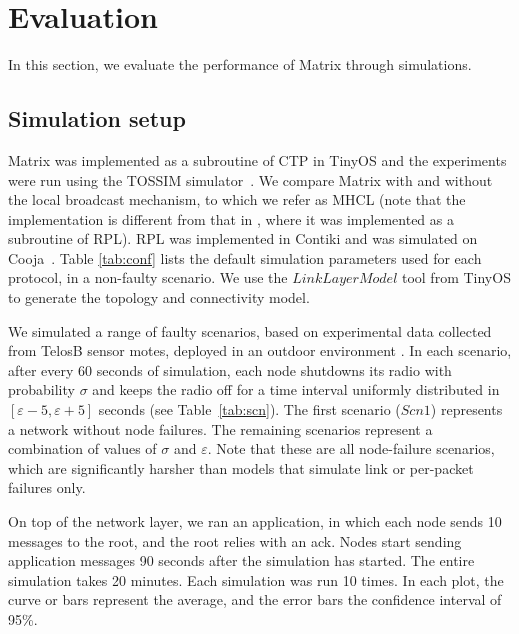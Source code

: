 \section{Evaluation}
\label{sec:results}

In this section, we evaluate the performance of Matrix through
simulations.

\subsection{Simulation setup}\label{subsec:sim}

Matrix was implemented as a subroutine of CTP in TinyOS \cite{tinyos}
and the experiments were run using the TOSSIM simulator~\cite{tossim}. We
compare Matrix with and without the local broadcast mechanism, to which we refer
as MHCL (note that the implementation is
different from that in \cite{2016techreport}, where it was implemented as a
subroutine of RPL). RPL was implemented in Contiki \cite{Dunkels:2004} and was
simulated on Cooja~\cite{Eriksson:2009}. Table \ref{tab:conf} lists the default
simulation parameters used for each protocol, in a non-faulty scenario. We use the $LinkLayerModel$ tool from TinyOS to generate the topology and connectivity model. %

We simulated a range of faulty scenarios, based on experimental data collected
from TelosB sensor motes, deployed in an outdoor
environment \cite{Baccour:2012}. In each scenario, after every 60 seconds of
simulation, each node shutdowns its radio with probability $\sigma$ and keeps
the radio off for a time interval uniformly distributed in
$[\varepsilon - 5, \varepsilon + 5]$ seconds (see Table~\ref{tab:scn}).
The first scenario ($Scn1$) represents a network without node failures. The
remaining scenarios represent a combination of values of $\sigma$ and
$\varepsilon$. Note that these are all node-failure scenarios, which are
significantly harsher than models that simulate link or per-packet
failures only.

On top of the network layer, we ran an application, in which each node
sends 10 messages to the root, and the root relies with an ack. Nodes start sending application messages 90 seconds after the simulation has started. The entire
simulation takes 20 minutes. Each simulation was run 10 times. In each plot,
the curve or bars represent the average, and the error bars the confidence
interval of 95\%.

